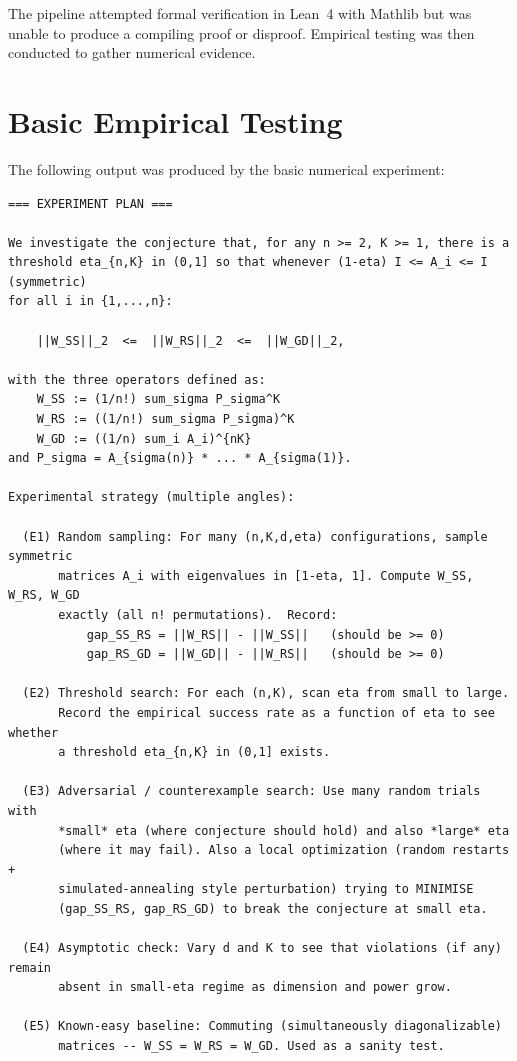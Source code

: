 \documentclass[11pt]{article}
\begin{document}
The pipeline attempted formal verification in Lean~4 with Mathlib but was unable to
produce a compiling proof or disproof. Empirical testing was then conducted to gather
numerical evidence.

\section{Basic Empirical Testing}

The following output was produced by the basic numerical experiment:

\begin{lstlisting}
=== EXPERIMENT PLAN ===

We investigate the conjecture that, for any n >= 2, K >= 1, there is a
threshold eta_{n,K} in (0,1] so that whenever (1-eta) I <= A_i <= I (symmetric)
for all i in {1,...,n}:

    ||W_SS||_2  <=  ||W_RS||_2  <=  ||W_GD||_2,

with the three operators defined as:
    W_SS := (1/n!) sum_sigma P_sigma^K
    W_RS := ((1/n!) sum_sigma P_sigma)^K
    W_GD := ((1/n) sum_i A_i)^{nK}
and P_sigma = A_{sigma(n)} * ... * A_{sigma(1)}.

Experimental strategy (multiple angles):

  (E1) Random sampling: For many (n,K,d,eta) configurations, sample symmetric
       matrices A_i with eigenvalues in [1-eta, 1]. Compute W_SS, W_RS, W_GD
       exactly (all n! permutations).  Record:
           gap_SS_RS = ||W_RS|| - ||W_SS||   (should be >= 0)
           gap_RS_GD = ||W_GD|| - ||W_RS||   (should be >= 0)

  (E2) Threshold search: For each (n,K), scan eta from small to large.
       Record the empirical success rate as a function of eta to see whether
       a threshold eta_{n,K} in (0,1] exists.

  (E3) Adversarial / counterexample search: Use many random trials with
       *small* eta (where conjecture should hold) and also *large* eta
       (where it may fail). Also a local optimization (random restarts +
       simulated-annealing style perturbation) trying to MINIMISE
       (gap_SS_RS, gap_RS_GD) to break the conjecture at small eta.

  (E4) Asymptotic check: Vary d and K to see that violations (if any) remain
       absent in small-eta regime as dimension and power grow.

  (E5) Known-easy baseline: Commuting (simultaneously diagonalizable)
       matrices -- W_SS = W_RS = W_GD. Used as a sanity test.


\end{lstlisting}
\end{document}
